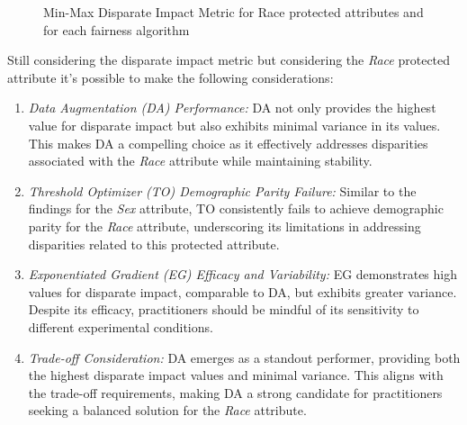 \begin{figure}[H]
    \centering
    \caption{Min-Max Disparate Impact Metric for Race protected attributes and for each fairness algorithm}
\end{figure}

Still considering the disparate impact metric but considering the \emph{Race} protected attribute it's possible to make the following considerations:

\begin{enumerate}
    \item \emph{Data Augmentation (DA) Performance:} DA not only provides the highest value for disparate impact but also exhibits minimal variance in its values. This makes DA a compelling choice as it effectively addresses disparities associated with the \emph{Race} attribute while maintaining stability.

    \item \emph{Threshold Optimizer (TO) Demographic Parity Failure:} Similar to the findings for the \emph{Sex} attribute, TO consistently fails to achieve demographic parity for the \emph{Race} attribute, underscoring its limitations in addressing disparities related to this protected attribute.

    \item \emph{Exponentiated Gradient (EG) Efficacy and Variability:} EG demonstrates high values for disparate impact, comparable to DA, but exhibits greater variance. Despite its efficacy, practitioners should be mindful of its sensitivity to different experimental conditions.

    \item \emph{Trade-off Consideration:} DA emerges as a standout performer, providing both the highest disparate impact values and minimal variance. This aligns with the trade-off requirements, making DA a strong candidate for practitioners seeking a balanced solution for the \emph{Race} attribute.
\end{enumerate}
